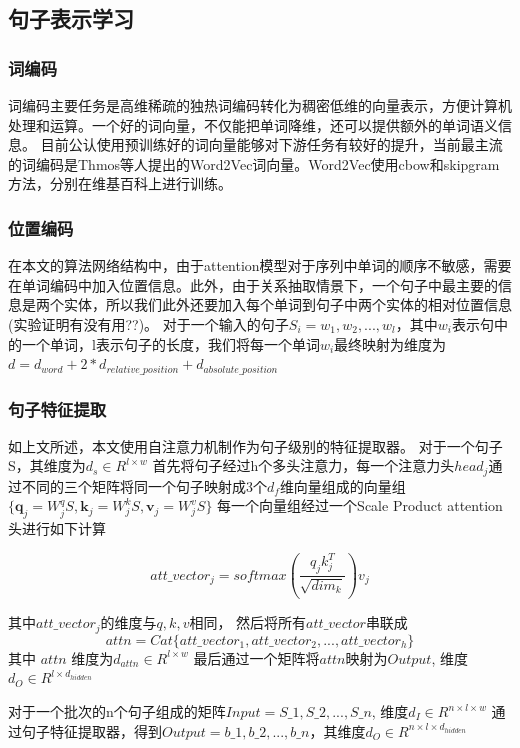 \documentclass[UTF8]{csoarticle}
\begin{document}
\subsection{句子表示学习}
\subsubsection{词编码}
词编码主要任务是高维稀疏的独热词编码转化为稠密低维的向量表示，方便计算机处理和运算。一个好的词向量，不仅能把单词降维，还可以提供额外的单词语义信息。
目前公认使用预训练好的词向量能够对下游任务有较好的提升，当前最主流的词编码是Thmos\cite{bib7}等人提出的Word2Vec词向量。Word2Vec使用cbow和skipgram方法，分别在维基百科上进行训练。
\subsubsection{位置编码}
在本文的算法网络结构中，由于attention模型对于序列中单词的顺序不敏感，需要在单词编码中加入位置信息。此外，由于关系抽取情景下，一个句子中最主要的信息是两个实体，所以我们此外还要加入每个单词到句子中两个实体的相对位置信息(实验证明有没有用??)。
对于一个输入的句子$S_i={w_1, w_2, ..., w_l}$，其中$w_i$表示句中的一个单词，l表示句子的长度，我们将每一个单词$w_i$最终映射为维度为$ d=d_{word} + 2*d_{relative\_position} + d_{absolute\_position}$

\subsubsection{句子特征提取}

如上文所述，本文使用自注意力机制作为句子级别的特征提取器。
对于一个句子S，其维度为$d_s\in R^{l\times w}$
首先将句子经过h个多头注意力，每一个注意力头$head_j$通过不同的三个矩阵将同一个句子映射成3个$d_{f}$维向量组成的向量组$\{\boldsymbol q_j=W_j^{q}S, \boldsymbol k_j=W_j^{k}S, \boldsymbol v_j=W_j^{v}S\}$
每一个向量组经过一个Scale Product attention头进行如下计算

\[ att\_vector_{j} = softmax(\frac{q_{j} k_{j}^{T} }{\sqrt{dim_k}})v_{j}\]

其中$att\_vector_j$的维度与$q, k, v$相同，
然后将所有$att\_vector$串联成
\[attn = Cat\{att\_vector_1,att\_vector_2,...,att\_vector_h\}\]
其中 $attn$ 维度为$d_{attn} \in R^{l\times w}$
最后通过一个矩阵将$attn$映射为$Output$, 维度$d_{O} \in R^{l\times d_{hidden}}$

对于一个批次的n个句子组成的矩阵$Input={S\_1, S\_2,...,S\_n}$, 维度$d_{I} \in R^{n\times l\times w}$
通过句子特征提取器，得到$Output={b\_1, b\_2,...,b\_n}$，其维度$d_{O} \in R^{n\times l\times  d_{hidden}}$
\end{document}
